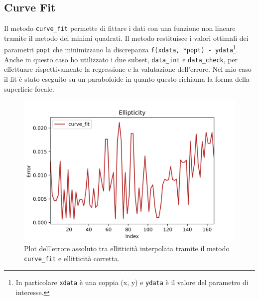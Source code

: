 \documentclass[12pt,a4paper,final]{book}
\begin{document}

\subsection{Curve Fit}\label{curve_fit}
Il metodo \texttt{curve\_fit} permette di fittare i dati con una funzione non lineare tramite il metodo dei minimi quadrati. Il metodo restituisce i valori ottimali dei parametri \texttt{popt} che minimizzano la discrepanza \texttt{f(xdata, *popt) - ydata}\footnote{In particolare \texttt{xdata} è una coppia (x, y) e \texttt{ydata} è il valore del parametro di interesse.}. Anche in questo caso ho utilizzato i due subset, \texttt{data\_int} e \texttt{data\_check}, per effettuare rispettivamente la regressione e la valutazione dell'errore. Nel mio caso il fit è stato eseguito su un paraboloide in quanto questo richiama la forma della superficie focale. \\
\begin{figure}
	\centering
	\includegraphics[scale=0.8]{../figures/error_curve_fit.png}
	\caption{Plot dell'errore assoluto tra ellitticità interpolata tramite il metodo \texttt{curve\_fit} e ellitticità corretta.}
	\label{err_curve_fit}
\end{figure}

\end{document}
